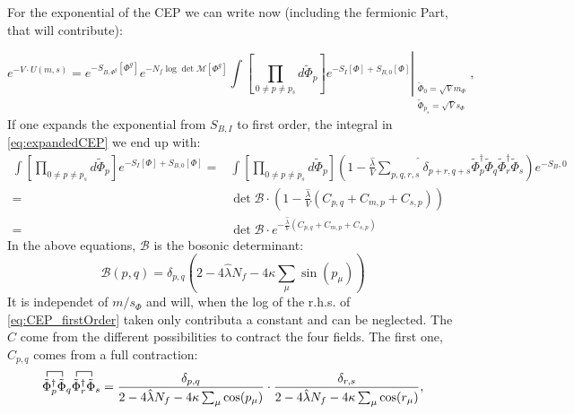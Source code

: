 For the exponential of the CEP we can write now (including the fermionic Part, that will contribute):

\begin{equation} \label{eq:expandedCEP}
 e^{-V\cdot U(m,s)} = e^{-S_{B,\Phi^g}[\Phi^g]} e^{-N_f \log \det \mathcal{M}[\Phi^g]} 
                      \int \left. \left[\prod\limits_{0 \neq p \neq p_s}  d \tilde \Phi_p \right]   
                      e^{-S_{I}[\Phi] +  S_{B,0}[\Phi]}
                       \right|_{ \begin{array}{l} \scriptscriptstyle \tilde \Phi_0=\sqrt{V} m_{\Phi} \\ 
                                     \scriptscriptstyle \tilde \Phi_{p_s}=\sqrt{V}s_{\Phi} \end{array}},
\end{equation}
If one expands the exponential from $S_{B,I}$ to first order, the integral in \eqref{eq:expandedCEP} we end up with:
\begin{align}\label{eq:CEP_firstOrder}
 \int \left[ \prod\limits_{0 \neq p \neq p_s}  d \tilde \Phi_p \right]   
                      e^{-S_{I}[\Phi] +  S_{B,0}[\Phi]} =& \int \left[ \prod\limits_{0 \neq p \neq p_s}  d \tilde \Phi_p \right] 
                      \left( 1 - \frac{\hat\lambda}{V} \hat{\sum\limits_{p,q,r,s}}\delta_{p+r,q+s} 
                      \tilde\Phi_p^{\dagger} \tilde\Phi_q \tilde\Phi_r^{\dagger} \tilde\Phi_s \right)e^{-S_B,0} \nonumber \\
                      =& \det \mathcal{B} \cdot \left(1 - \frac{\hat\lambda}{V} \left( C_{p,q} + C_{m,p} + C_{s,p} \right) \right) \nonumber \\
                      =& \det \mathcal{B} \cdot e^{-\frac{\hat\lambda}{V} \left( C_{p,q} + C_{m,p} + C_{s,p} \right)}
\end{align}
In the above equations, $\mathcal{B}$ is the bosonic determinant:
\begin{equation}\label{eq:def_BosonicDeterminant}
\mathcal{B}(p,q)=\delta_{p,q} \left( 2 - 4 \hat\lambda N_f - 4 \kappa \sum\limits_{\mu} \sin(p_{\mu}) \right)
\end{equation}
It is independet of $m/s_{\Phi}$ and will, 
when the log of the r.h.s. of \eqref{eq:CEP_firstOrder} taken only contributa a constant and can be neglected.
The $C$ come from the different possibilities to contract the four fields. 
The first one, $C_{p,q}$ comes from a full contraction:
\begin{equation}\label{eq:CEP_firstOrderLambda_VacuumBubble}
 \contraction{}{\tilde\Phi}{{}_p^{\dagger}}{\tilde\Phi} \tilde\Phi_p^{\dagger} \tilde\Phi_q
  \contraction{}{\tilde\Phi}{{}_r^{\dagger}}{\tilde\Phi} \tilde\Phi_r^{\dagger} \tilde\Phi_s = 
    \frac{ \delta_{p,q}}{2 - 4 \hat\lambda N_f - 4 \kappa \sum_{\mu} \cos(p_{\mu}) } \cdot 
    \frac{ \delta_{r,s}}{2 - 4 \hat\lambda N_f - 4 \kappa \sum_{\mu} \cos(r_{\mu}) },
\end{equation}
